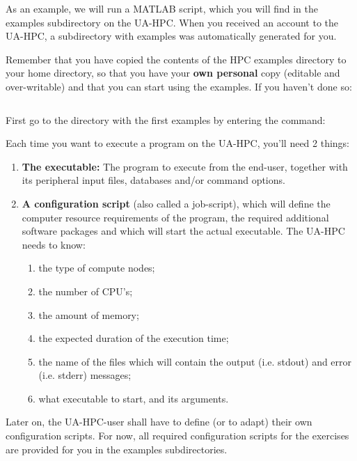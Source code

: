 As an example, we will run a MATLAB script, which you will find in the examples subdirectory on the UA-HPC. When you received an account to the UA-HPC, a subdirectory with examples was automatically generated for you.

Remember that you have copied the contents of the HPC examples directory to your home directory, so that you have your \textbf{own personal }copy (editable and over-writable) and that you can start using the examples. If you haven't done so:
\begin{prompt}
$ %
$ %
\end{prompt}

First go to the directory with the first examples by entering the command:
\begin{prompt}
$ %
\end{prompt}

Each time you want to execute a program on the UA-HPC, you'll need 2 things:

\begin{enumerate}
\item  \textbf{The executable:} The program to execute from the end-user, together with its peripheral input files, databases and/or command options.
\item  \textbf{A configuration script }(also called a job-script), which will define the computer resource requirements of the program, the required additional software packages and which will start the actual executable.  The UA-HPC needs to know:

\begin{enumerate}
\item  the type of compute nodes;
\item  the number of CPU's;
\item  the amount of memory;
\item  the expected duration of the execution time;
\item  the name of the files which will contain the output (i.e. stdout) and error (i.e. stderr) messages;
\item  what executable to start, and its arguments.
\end{enumerate}
\end{enumerate}

Later on, the UA-HPC-user shall have to define (or to adapt) their own configuration scripts. For now, all required configuration scripts for the exercises are provided for you in the examples subdirectories.


